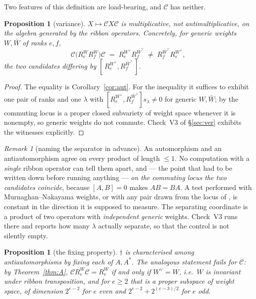 \documentclass[11pt]{article}
\newtheorem{proposition}[theorem]{Proposition}
\theoremstyle{definition}
\theoremstyle{remark}
\newtheorem{remark}[theorem]{Remark}
\newcommand{\Cop}{\mathcal{C}}
\begin{document}
Two features of this definition are load-bearing, and $\Cop$ has neither.

\begin{proposition}[variance]\label{prop:variance}
$X\mapsto\Cop X\Cop$ is multiplicative, not antimultiplicative, on the algebra generated by
the ribbon operators.  Concretely, for generic weights $W,\bar W$ of ranks $e,f$,
\[
   \Cop\bigl(R_e^{W}R_f^{\bar W}\bigr)\Cop \;=\; R_e^{W^\vee}R_f^{\bar W^\vee}
   \;\ne\; R_f^{\bar W^\vee}R_e^{W^\vee},
\]
the two candidates differing by $[\,R_e^{W^\vee},R_f^{\bar W^\vee}\,]$.
\end{proposition}

\begin{proof}
The equality is Corollary~\ref{cor:aut}.  For the inequality it suffices to exhibit one
pair of ranks and one $\lambda$ with $[R_e^{W^\vee},R_f^{\bar W^\vee}]s_\lambda\ne0$ for
generic $W,\bar W$; by \cite[Thm.~\texttt{thm:main}]{Q149} the commuting locus is a proper
closed subvariety of weight space whenever it is nonempty, so generic weights do not
commute.  Check~V3 of \S\ref{sec:ver} exhibits the witnesses explicitly.
\end{proof}

\begin{remark}[naming the separator in advance]\label{rem:sep}
An automorphism and an antiautomorphism agree on every product of length $\le1$.  No
computation with a \emph{single} ribbon operator can tell them apart, and --- the point
that had to be written down before running anything --- \emph{on the commuting locus the
two candidates coincide}, because $[A,B]=0$ makes $AB=BA$.  A test performed with
Murnaghan--Nakayama weights, or with any pair drawn from the locus of
\cite[Thm.~\texttt{thm:main}]{Q149}, is constant in the direction it is supposed to
measure.  The separating coordinate is a product of two operators with
\emph{independent generic} weights.  Check~V3 runs there and reports how many $\lambda$
actually separate, so that the control is not silently empty.
\end{remark}

\begin{proposition}[the fixing property]\label{prop:fixing}
$\dagger$ is characterised among antiautomorphisms by fixing each of $A,A^*$.  The
analogous statement fails for $\Cop$: by Theorem~\ref{thm:A}, $\Cop R_e^{W}\Cop=R_e^{W}$ if
and only if $W^\vee=W$, i.e.\ $W$ is invariant under ribbon transposition, and for $e\ge2$
that is a \emph{proper} subspace of weight space, of dimension $2^{e-2}$ for $e$ even and
$2^{e-2}+2^{(e-3)/2}$ for $e$ odd.
\end{proposition}
\end{document}
